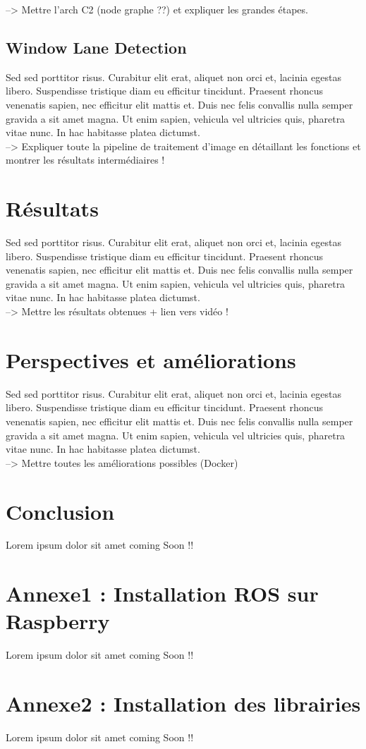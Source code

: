 \documentclass[12pt, openany]{report}
\begin{document}
--> Mettre l'arch C2 (node graphe ??) et expliquer les grandes étapes.

\subsection{Window Lane Detection}
Sed sed porttitor risus. Curabitur elit erat, aliquet non orci et, lacinia egestas libero. Suspendisse tristique diam eu efficitur tincidunt. Praesent rhoncus venenatis sapien, nec efficitur elit mattis et. Duis nec felis convallis nulla semper gravida a sit amet magna. Ut enim sapien, vehicula vel ultricies quis, pharetra vitae nunc. In hac habitasse platea dictumst.\\

--> Expliquer toute la pipeline de traitement d'image en détaillant les fonctions et montrer les résultats intermédiaires !

\section{Résultats}
Sed sed porttitor risus. Curabitur elit erat, aliquet non orci et, lacinia egestas libero. Suspendisse tristique diam eu efficitur tincidunt. Praesent rhoncus venenatis sapien, nec efficitur elit mattis et. Duis nec felis convallis nulla semper gravida a sit amet magna. Ut enim sapien, vehicula vel ultricies quis, pharetra vitae nunc. In hac habitasse platea dictumst.\\

--> Mettre les résultats obtenues + lien vers vidéo !

\section{Perspectives et améliorations}
Sed sed porttitor risus. Curabitur elit erat, aliquet non orci et, lacinia egestas libero. Suspendisse tristique diam eu efficitur tincidunt. Praesent rhoncus venenatis sapien, nec efficitur elit mattis et. Duis nec felis convallis nulla semper gravida a sit amet magna. Ut enim sapien, vehicula vel ultricies quis, pharetra vitae nunc. In hac habitasse platea dictumst.\\

--> Mettre toutes les améliorations possibles (Docker)

\section*{Conclusion}
Lorem ipsum dolor sit amet
coming Soon !!

\section*{Annexe1 : Installation ROS sur Raspberry}
Lorem ipsum dolor sit amet
coming Soon !!

\section*{Annexe2 : Installation des librairies}
Lorem ipsum dolor sit amet
coming Soon !!
\end{document}
